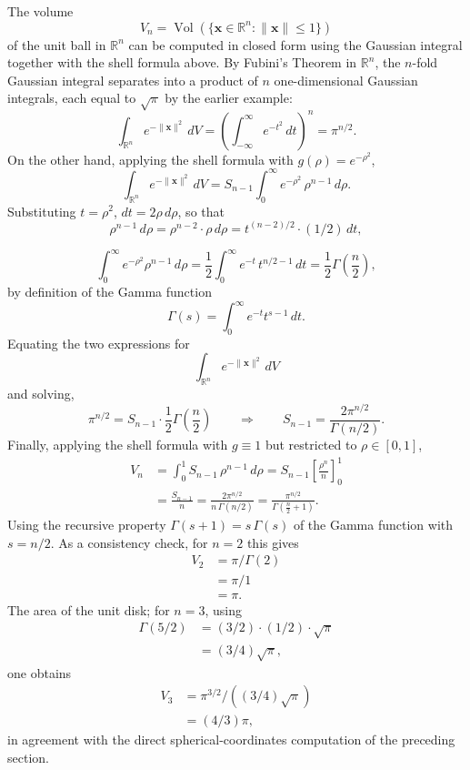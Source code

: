 \begin{example}
The volume
\[
V_n = \operatorname{Vol}(\{\mathbf{x}\in\mathbb{R}^n : \|\mathbf{x}\|\leq 1\})
\]
 of the unit ball in $\mathbb{R}^n$ can be computed in closed form using the Gaussian integral together with the shell formula above. By Fubini's Theorem in $\mathbb{R}^n$, the $n$-fold Gaussian integral separates into a product of $n$ one-dimensional Gaussian integrals, each equal to $\sqrt{\pi}$ by the earlier example:
\[
\int_{\mathbb{R}^n} e^{-\|\mathbf{x}\|^2}\, dV = \left( \int_{-\infty}^{\infty} e^{-t^2}\, dt \right)^n = \pi^{n/2}.
\]
On the other hand, applying the shell formula with $g(\rho) = e^{-\rho^2}$,
\[
\int_{\mathbb{R}^n} e^{-\|\mathbf{x}\|^2}\, dV = S_{n-1} \int_0^{\infty} e^{-\rho^2}\, \rho^{n-1}\, d\rho.
\]
Substituting $t = \rho^2$, $dt = 2\rho\, d\rho$, so that
\[
\rho^{n-1}\, d\rho = \rho^{n-2}\cdot \rho\, d\rho = t^{(n-2)/2} \cdot (1/2)\, dt,
\]

\[
\int_0^{\infty} e^{-\rho^2}\rho^{n-1}\, d\rho = \frac{1}{2}\int_0^{\infty} e^{-t}\, t^{n/2-1}\, dt = \frac{1}{2}\Gamma\!\left(\frac{n}{2}\right),
\]
by definition of the Gamma function
\[
\Gamma(s) = \int_0^\infty e^{-t}t^{s-1}\,dt.
\]
Equating the two expressions for \[
\int_{\mathbb{R}^n} e^{-\|\mathbf{x}\|^2}\, dV
\] and solving,
\[
\pi^{n/2} = S_{n-1}\cdot \frac{1}{2}\Gamma\!\left(\frac{n}{2}\right) \qquad\Longrightarrow\qquad S_{n-1} = \frac{2\pi^{n/2}}{\Gamma(n/2)}.
\]
Finally, applying the shell formula with $g \equiv 1$ but restricted to $\rho \in [0,1]$,
\[
\begin{aligned}
V_n &= \int_0^1 S_{n-1}\, \rho^{n-1}\, d\rho
= S_{n-1} \left[\frac{\rho^n}{n}\right]_0^1 \\
&= \frac{S_{n-1}}{n}
= \frac{2\pi^{n/2}}{n\,\Gamma(n/2)}
= \frac{\pi^{n/2}}{\Gamma\!\left(\frac{n}{2}+1\right)}.
\end{aligned}
\]
Using the recursive property $\Gamma(s+1) = s\,\Gamma(s)$ of the Gamma function with $s=n/2$. As a consistency check, for $n=2$ this gives
\[
\begin{aligned}
V_2 &= \pi/\Gamma(2) \\
&= \pi/1 \\
&= \pi.
\end{aligned}
\]
The area of the unit disk; for $n=3$, using
\[
\begin{aligned}
\Gamma(5/2) &= (3/2)\cdot(1/2)\cdot\sqrt{\pi} \\
&= (3/4)\sqrt{\pi},
\end{aligned}
\]
one obtains
\[
\begin{aligned}
V_3 &= \pi^{3/2}/((3/4)\sqrt{\pi}) \\
&= (4/3)\pi,
\end{aligned}
\]
in agreement with the direct spherical-coordinates computation of the preceding section.
\end{example}

